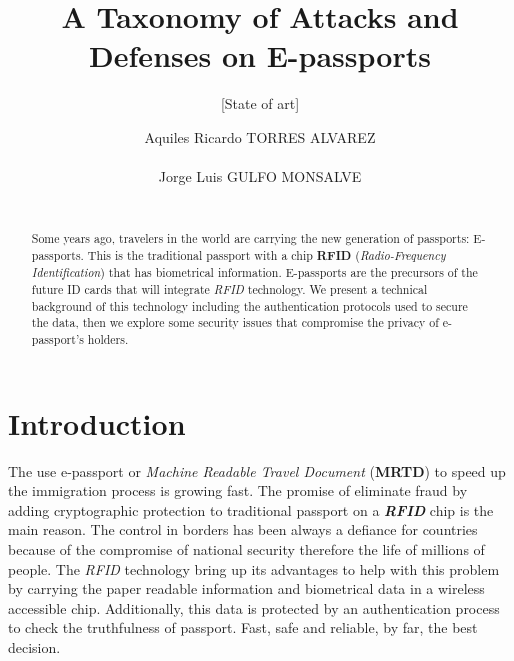 \documentclass{acm_proc_article-sp}
\begin{document}
\title{A Taxonomy of Attacks and Defenses on E-passports}
\subtitle{[State of art]}

\author{
\alignauthor
Aquiles Ricardo TORRES ALVAREZ%
       \\
       \\
\alignauthor
Jorge Luis GULFO MONSALVE%
       \\
       \\
}

\maketitle
\begin{abstract}
Some years ago, travelers in the world are carrying the new generation of passports: E-passports. This is the traditional passport with a chip \textbf{RFID} (\emph{Radio-Frequency Identification}) that has biometrical information. E-passports are the precursors of the future ID cards that will integrate \emph{RFID} technology. We present a technical background of this technology including the authentication protocols used to secure the data, then we explore some security issues that compromise the privacy of e-passport’s holders.  

\end{abstract}



\section{Introduction}
The use e-passport or \emph{Machine Readable Travel Document} (\textbf{MRTD}) to speed up the immigration process is growing fast. The promise of eliminate fraud by adding cryptographic protection to traditional passport on a \emph{\textbf{RFID}} chip is the main reason.
The control in borders has been always a defiance for countries because of the compromise of national security therefore the life of millions of people. The \emph{RFID }technology bring up its advantages to help with this problem by carrying the paper readable information and biometrical data in a wireless accessible chip. Additionally, this data is protected by an authentication process to check the truthfulness of passport. Fast, safe and reliable, by far, the best decision. 
\end{document}
